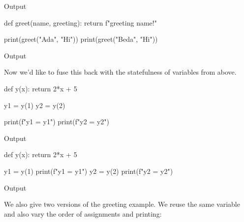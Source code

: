 \begin{description}
\begin{frame}[fragile]
\begin{minipage}[t]{0.45\columnwidth}
      \begin{block}{Output}\printpythontex[verbatim]\end{block}
    \end{minipage}
    \hfill
    \begin{minipage}[t]{0.45\columnwidth}
      \begin{pyblock}[funcG2]
def greet(name, greeting):
  return f"{greeting} {name}!"

print(greet("Ada", "Hi"))
print(greet("Beda", "Hi"))
      \end{pyblock}

      \begin{block}{Output}\printpythontex[verbatim]\end{block}
    \end{minipage}
    \end{frame}

  \item[Fusion] Now we'd like to fuse this back with the statefulness of 
    variables from above.

    \begin{frame}[fragile]
    \begin{minipage}[t]{0.45\columnwidth}
      \begin{pyblock}[funcG1]
def y(x):
  return 2*x + 5

y1 = y(1)
y2 = y(2)

print(f"y1 = {y1}")
print(f"y2 = {y2}")
      \end{pyblock}

      \begin{block}{Output}\printpythontex[verbatim]\end{block}
    \end{minipage}
    \hfill
    \begin{minipage}[t]{0.45\columnwidth}
      \begin{pyblock}[funcG1]
def y(x):
  return 2*x + 5


y1 = y(1)
print(f"y1 = {y1}")
y2 = y(2)
print(f"y2 = {y2}")
      \end{pyblock}

      \begin{block}{Output}\printpythontex[verbatim]\end{block}
    \end{minipage}
    \end{frame}

    We also give two versions of the greeting example.
    We reuse the same variable and also vary the order of assignments and 
    printing:



\end{description}
